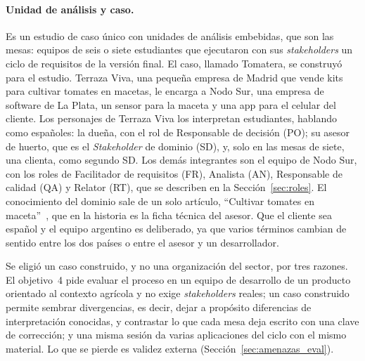 \documentclass[12pt,letterpaper,oneside]{report}
\begin{document}
\paragraph{Unidad de análisis y caso.}
Es un estudio de caso único con unidades de análisis embebidas, que son las
mesas: equipos de seis o siete estudiantes que ejecutaron
con sus \textit{stakeholders} un ciclo de requisitos de la versión final. El
caso, llamado Tomatera, se construyó para el estudio. Terraza Viva, una pequeña
empresa de Madrid que vende kits para cultivar tomates en macetas, le encarga a
Nodo Sur, una empresa de software de La Plata, un sensor para la maceta y una
app para el celular del cliente. Los personajes de Terraza Viva los interpretan
estudiantes, hablando como españoles: la dueña, con el rol de Responsable de
decisión (PO); su asesor de huerto, que es el \textit{Stakeholder} de dominio
(SD), y, solo en las mesas de siete, una clienta, como segundo SD. Los demás
integrantes son el equipo de Nodo Sur, con los roles de Facilitador de
requisitos (FR), Analista (AN), Responsable de calidad (QA) y Relator (RT), que
se describen en la Sección~\ref{sec:roles}. El conocimiento del dominio sale de
un solo artículo, ``Cultivar tomates en maceta''~\cite{verdeesvida_tomates}, que
en la historia es la ficha técnica del asesor. Que el cliente sea español y el
equipo argentino es deliberado, ya que varios términos cambian de sentido entre
los dos países o entre el asesor y un desarrollador.

Se eligió un caso construido, y no una organización del sector, por tres
razones. El objetivo~4 pide evaluar el proceso en un equipo de desarrollo de un
producto orientado al contexto agrícola y no exige \textit{stakeholders} reales;
un caso construido permite sembrar divergencias, es decir, dejar a propósito
diferencias de interpretación conocidas, y contrastar lo que
cada mesa deja escrito con una clave de corrección; y una misma sesión da varias
aplicaciones del ciclo con el mismo material. Lo que se pierde es validez
externa (Sección~\ref{sec:amenazas_eval}).
\end{document}
